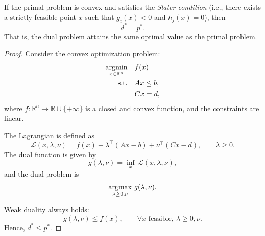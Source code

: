 \documentclass[../main]{subfiles}
\begin{document}
\begin{theorem}
If the primal problem is convex and satisfies the \emph{Slater condition} (i.e., there exists a strictly feasible point $x$ such that $g_i(x) < 0$ and $h_j(x) = 0$),
then
\begin{equation}
d^* = p^*.
\end{equation}
That is, the dual problem attains the same optimal value as the primal problem.
\end{theorem}
\begin{proof}
    Consider the convex optimization problem:
    \begin{equation}
        \begin{aligned}
            \mathop{\mathrm{argmin}}_{x \in \mathbb{R}^n} \quad & f(x) \\
            \text{s.t.} \quad & A x \le b, \\
            & C x = d,
        \end{aligned}
    \end{equation}
    where $f:\mathbb{R}^n \to \mathbb{R} \cup \{+\infty\}$ is a closed and convex function, and the constraints are linear.

    The Lagrangian is defined as
    \begin{equation}
        \mathcal{L}(x, \lambda, \nu)
        = f(x) + \lambda^\top (A x - b) + \nu^\top (C x - d),
        \qquad \lambda \ge 0.
    \end{equation}
    The dual function is given by
    \begin{equation}
        g(\lambda, \nu) = \inf_{x} \, \mathcal{L}(x, \lambda, \nu),
    \end{equation}
    and the dual problem is
    \begin{equation}
        \mathop{\mathrm{argmax}}_{\lambda \ge 0, \nu} \, g(\lambda, \nu).
    \end{equation}

    Weak duality always holds:
    \begin{equation}
        g(\lambda, \nu) \le f(x), \qquad \forall x \text{ feasible},\ \lambda \ge 0, \nu.
    \end{equation}
    Hence, $d^* \le p^*$.


\end{proof}
\end{document}
